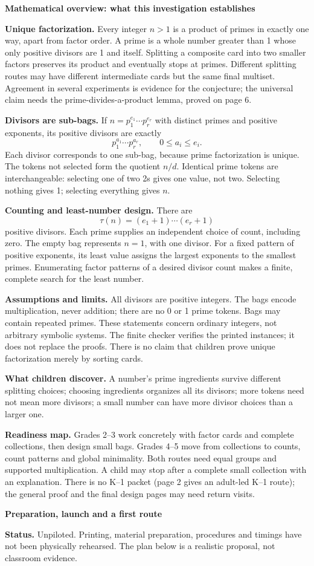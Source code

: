 \documentclass[11pt]{article}
\newcommand{\head}[1]{\par\textbf{\large #1}\par}
\begin{document}
\head{Mathematical overview: what this investigation establishes}
\textbf{Unique factorization.} Every integer $n>1$ is a product of primes in exactly one way, apart from factor order. A prime is a whole number greater than 1 whose only positive divisors are 1 and itself. Splitting a composite card into two smaller factors preserves its product and eventually stops at primes. Different splitting routes may have different intermediate cards but the same final multiset. Agreement in several experiments is evidence for the conjecture; the universal claim needs the prime-divides-a-product lemma, proved on page 6.

\textbf{Divisors are sub-bags.} If $n=p_1^{e_1}\cdots p_r^{e_r}$ with distinct primes and positive exponents, its positive divisors are exactly
\[
 p_1^{a_1}\cdots p_r^{a_r},\qquad 0\le a_i\le e_i.
\]
Each divisor corresponds to one sub-bag, because prime factorization is unique. The tokens not selected form the quotient $n/d$. Identical prime tokens are interchangeable: selecting one of two 2s gives one value, not two. Selecting nothing gives 1; selecting everything gives $n$.

\textbf{Counting and least-number design.} There are
\[
 \tau(n)=(e_1+1)\cdots(e_r+1)
\]
positive divisors. Each prime supplies an independent choice of count, including zero. The empty bag represents $n=1$, with one divisor. For a fixed pattern of positive exponents, its least value assigns the largest exponents to the smallest primes. Enumerating factor patterns of a desired divisor count makes a finite, complete search for the least number.

\textbf{Assumptions and limits.} All divisors are positive integers. The bags encode multiplication, never addition; there are no 0 or 1 prime tokens. Bags may contain repeated primes. These statements concern ordinary integers, not arbitrary symbolic systems. The finite checker verifies the printed instances; it does not replace the proofs. There is no claim that children prove unique factorization merely by sorting cards.

\textbf{What children discover.} A number's prime ingredients survive different splitting choices; choosing ingredients organizes all its divisors; more tokens need not mean more divisors; a small number can have more divisor choices than a larger one.

\textbf{Readiness map.} Grades 2--3 work concretely with factor cards and complete collections, then design small bags. Grades 4--5 move from collections to counts, count patterns and global minimality. Both routes need equal groups and supported multiplication. A child may stop after a complete small collection with an explanation. There is no K--1 packet (page 2 gives an adult-led K--1 route); the general proof and the final design pages may need return visits.
\newpage
\head{Preparation, launch and a first route}
\textbf{Status.} Unpiloted. Printing, material preparation, procedures and timings have not been physically rehearsed. The plan below is a realistic proposal, not classroom evidence.
\end{document}
